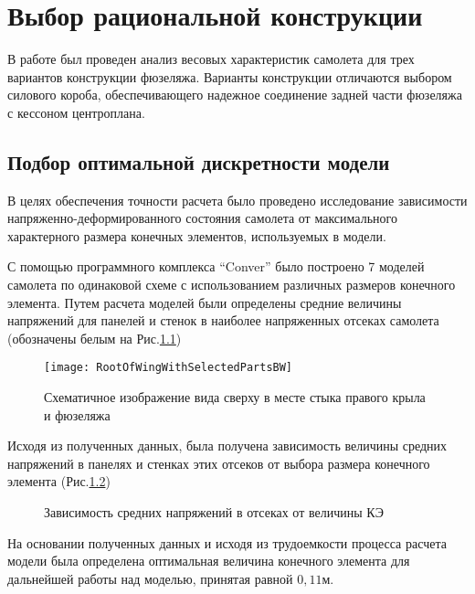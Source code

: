  
\chapter{Выбор рациональной конструкции}

В работе был проведен анализ весовых характеристик самолета для трех вариантов конструкции фюзеляжа. Варианты конструкции отличаются выбором силового короба, обеспечивающего надежное соединение задней части фюзеляжа с кессоном центроплана. 

%

\section{Подбор оптимальной дискретности модели}

В целях обеспечения точности расчета было проведено исследование зависимости напряженно-деформированного состояния самолета от максимального характерного размера конечных элементов, используемых в модели. 

С помощью программного комплекса ``Conver'' было построено 7 моделей самолета по одинаковой схеме с использованием различных размеров конечного элемента. Путем расчета моделей были определены средние величины напряжений для панелей и стенок в наиболее напряженных отсеках самолета (обозначены белым на  Рис.\ref{fig:WingRootPlain})

\begin{figure}[ht]
\centering
\texttt{[image: RootOfWingWithSelectedPartsBW]}
\caption{Схематичное изображение вида сверху в месте стыка правого крыла и фюзеляжа}
\label{fig:WingRootPlain}
\end{figure}




Исходя из полученных данных, была получена зависимость величины средних напряжений в панелях и стенках этих отсеков от выбора размера конечного элемента (Рис.\ref{fig:stressToDiscreteness})

\begin{figure}[H]
\centering

\caption{Зависимость средних напряжений в отсеках от величины КЭ}
\label{fig:stressToDiscreteness}
\end{figure}

На основании полученных данных и исходя из трудоемкости процесса расчета модели была определена оптимальная величина конечного элемента для дальнейшей работы над моделью, принятая равной $0,11\text{м}$. 
